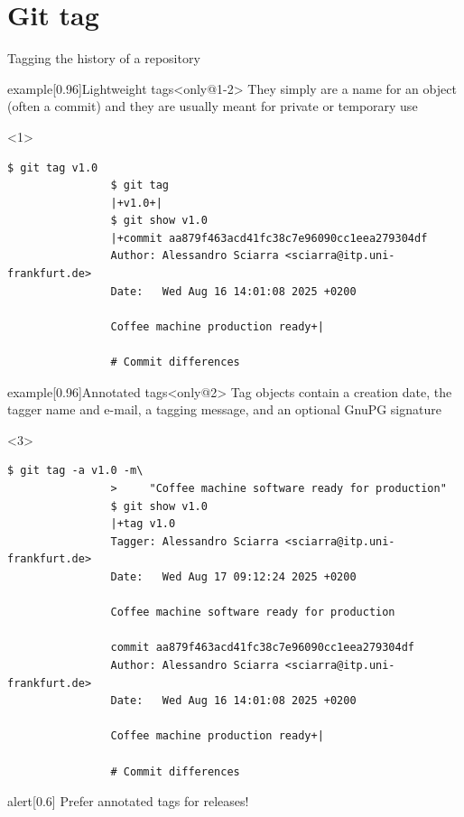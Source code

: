 \documentclass[usenames,svgnames,14pt]{beamer}
\begin{document}
\section{Git tag}
\begin{frame}[fragile]{Tagging the history of a repository}
    \vspace{-12mm}
    \begin{overlayarea}{\textwidth}{0.7\textheight}
        \begin{varblock}{example}[0.96\textwidth]{Lightweight tags}<only@1-2>
            They simply are a name for an object (often a commit) and they are usually meant for private or temporary use
        \end{varblock}
        \begin{onlyenv}<1>
            \begin{lstlisting}[style=MyBash]
                $ git tag v1.0
                $ git tag
                |+v1.0+|
                $ git show v1.0
                |+commit aa879f463acd41fc38c7e96090cc1eea279304df
                Author: Alessandro Sciarra <sciarra@itp.uni-frankfurt.de>
                Date:   Wed Aug 16 14:01:08 2025 +0200

                Coffee machine production ready+|

                # Commit differences
            \end{lstlisting}
        \end{onlyenv}
        \begin{varblock}{example}[0.96\textwidth]{Annotated tags}<only@2>
            Tag objects contain a creation date, the tagger name and e-mail, a tagging message, and an optional GnuPG signature
        \end{varblock}
        \begin{onlyenv}<3>
            \begin{lstlisting}[style=MyBash, aboveskip=3mm]
                $ git tag -a v1.0 -m\
                >     "Coffee machine software ready for production"
                $ git show v1.0
                |+tag v1.0
                Tagger: Alessandro Sciarra <sciarra@itp.uni-frankfurt.de>
                Date:   Wed Aug 17 09:12:24 2025 +0200

                Coffee machine software ready for production

                commit aa879f463acd41fc38c7e96090cc1eea279304df
                Author: Alessandro Sciarra <sciarra@itp.uni-frankfurt.de>
                Date:   Wed Aug 16 14:01:08 2025 +0200

                Coffee machine production ready+|

                # Commit differences
            \end{lstlisting}
            \begin{varblock}{alert}[0.6\textwidth]{}
                \alert{Prefer annotated tags for releases!}
            \end{varblock}
        \end{onlyenv}
    \end{overlayarea}
\end{frame}
\end{document}
